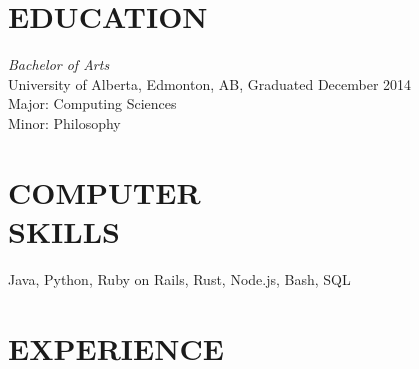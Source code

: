 \documentclass[margin, 10pt]{res} %
\begin{document}
\begin{resume}

 



\section{EDUCATION}

{\sl Bachelor of Arts}\\
University of Alberta, Edmonton, AB, Graduated December 2014 \\
Major: Computing Sciences \\
Minor: Philosophy
 

\section{COMPUTER \\ SKILLS} 

Java, Python, Ruby on Rails, Rust, Node.js, Bash, SQL\\
 
 
\section{EXPERIENCE}


\end{resume}
\end{document}
